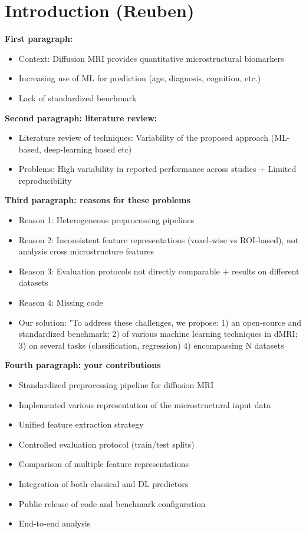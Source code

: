 \section{Introduction (Reuben)}
\textbf{First paragraph:}
\begin{itemize}
    \item Context: Diffusion MRI provides quantitative microstructural biomarkers
    \item Increasing use of ML for prediction (age, diagnosis, cognition, etc.)
    \item Lack of standardized benchmark
\end{itemize}

\noindent \textbf{Second paragraph: literature review:}
\begin{itemize}
    \item  Literature review of techniques: Variability of the proposed approach (ML-based, deep-learning based etc)
    \item Problems: High variability in reported performance across studies + Limited reproducibility 
\end{itemize}

\noindent \textbf{Third paragraph: reasons for these problems}
\begin{itemize}
    \item Reason 1: Heterogeneous preprocessing pipelines
    \item Reason 2: Inconsistent feature representations (voxel-wise vs ROI-based), not analysis cross microstructure features
    \item Reason 3: Evaluation protocols not directly comparable + results on different datasets
    \item Reason 4: Missing code
    \item Our solution: "To address these challenges, we propose: 1) an open-source and standardized benchmark; 2) of various machine learning techniques in dMRI; 3) on several tasks (classification, regression) 4) encompassing N datasets 
\end{itemize}

\noindent \textbf{Fourth paragraph: your contributions}
\begin{itemize}
    \item Standardized preprocessing pipeline for diffusion MRI
    \item Implemented various representation of the microstructural input data
    \item Unified feature extraction strategy
    \item Controlled evaluation protocol (train/test splits)
    \item Comparison of multiple feature representations
    \item Integration of both classical and DL predictors
    \item Public release of code and benchmark configuration
    \item End-to-end analysis
\end{itemize}

